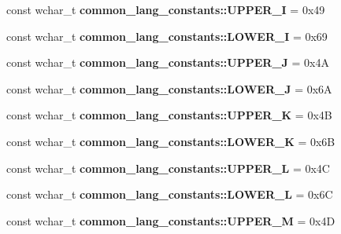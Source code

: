 \begin{DoxyCompactItemize}
\item 
\hypertarget{group___indexing_ga9a547167594537847210f0db7d909d87}{const wchar\-\_\-t {\bfseries common\-\_\-lang\-\_\-constants\-::\-U\-P\-P\-E\-R\-\_\-\-I} = 0x49}\label{group___indexing_ga9a547167594537847210f0db7d909d87}

\item 
\hypertarget{group___indexing_ga0c32533db2c4a52820e85bf8fa7ec8dd}{const wchar\-\_\-t {\bfseries common\-\_\-lang\-\_\-constants\-::\-L\-O\-W\-E\-R\-\_\-\-I} = 0x69}\label{group___indexing_ga0c32533db2c4a52820e85bf8fa7ec8dd}

\item 
\hypertarget{group___indexing_ga51362e0126c946a999e4c2eca9dbbc9e}{const wchar\-\_\-t {\bfseries common\-\_\-lang\-\_\-constants\-::\-U\-P\-P\-E\-R\-\_\-\-J} = 0x4\-A}\label{group___indexing_ga51362e0126c946a999e4c2eca9dbbc9e}

\item 
\hypertarget{group___indexing_gab2ea07dd4cc885abed60af7a6e72c9b0}{const wchar\-\_\-t {\bfseries common\-\_\-lang\-\_\-constants\-::\-L\-O\-W\-E\-R\-\_\-\-J} = 0x6\-A}\label{group___indexing_gab2ea07dd4cc885abed60af7a6e72c9b0}

\item 
\hypertarget{group___indexing_ga86443f28f6588d67a4ea0ae119e25e70}{const wchar\-\_\-t {\bfseries common\-\_\-lang\-\_\-constants\-::\-U\-P\-P\-E\-R\-\_\-\-K} = 0x4\-B}\label{group___indexing_ga86443f28f6588d67a4ea0ae119e25e70}

\item 
\hypertarget{group___indexing_ga021cf8fdc5bfd5f86f22585ff453ad09}{const wchar\-\_\-t {\bfseries common\-\_\-lang\-\_\-constants\-::\-L\-O\-W\-E\-R\-\_\-\-K} = 0x6\-B}\label{group___indexing_ga021cf8fdc5bfd5f86f22585ff453ad09}

\item 
\hypertarget{group___indexing_ga239f94ed783bfa8d81d11eccbd5dfcac}{const wchar\-\_\-t {\bfseries common\-\_\-lang\-\_\-constants\-::\-U\-P\-P\-E\-R\-\_\-\-L} = 0x4\-C}\label{group___indexing_ga239f94ed783bfa8d81d11eccbd5dfcac}

\item 
\hypertarget{group___indexing_ga34309677073cbf6513d30351bee1dd7b}{const wchar\-\_\-t {\bfseries common\-\_\-lang\-\_\-constants\-::\-L\-O\-W\-E\-R\-\_\-\-L} = 0x6\-C}\label{group___indexing_ga34309677073cbf6513d30351bee1dd7b}

\item 
\hypertarget{group___indexing_gafa8572db46a3bd161c8f818d0a3a071e}{const wchar\-\_\-t {\bfseries common\-\_\-lang\-\_\-constants\-::\-U\-P\-P\-E\-R\-\_\-\-M} = 0x4\-D}\label{group___indexing_gafa8572db46a3bd161c8f818d0a3a071e}


\end{DoxyCompactItemize}
